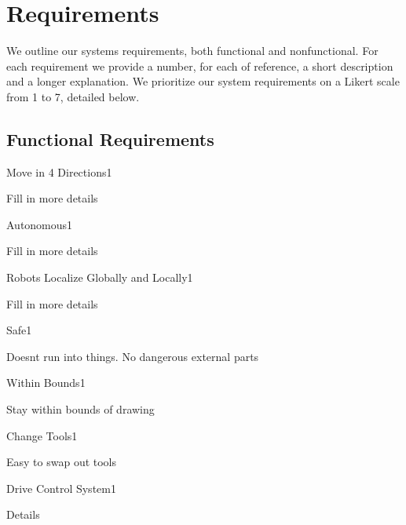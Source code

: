 
\section{Requirements}
\label{sec:requirements}
We outline our systems requirements, both functional and nonfunctional. For each requirement we provide a number, for each of reference, a short description and a longer explanation. We prioritize our system requirements on a Likert scale from 1 to 7, detailed below. 


\subsection{Functional Requirements}
\label{sec:functional_requirements}

\begin{functional_requirement}{Move in 4 Directions}{1}
\item Fill in more details 
\end{functional_requirement}

\begin{functional_requirement}{Autonomous}{1}
\item Fill in more details 
\end{functional_requirement}

\begin{functional_requirement}{Robots Localize Globally and Locally}{1}
\item Fill in more details 
\end{functional_requirement}

\begin{functional_requirement}{Safe}{1}
\item Doesnt run into things. No dangerous external parts
\end{functional_requirement}

\begin{functional_requirement}{Within Bounds}{1}
\item Stay within bounds of drawing
\end{functional_requirement}

\begin{functional_requirement}{Change Tools}{1}
\item Easy to swap out tools
\end{functional_requirement}

\begin{functional_requirement}{Drive Control System}{1}
\item Details
\end{functional_requirement}

